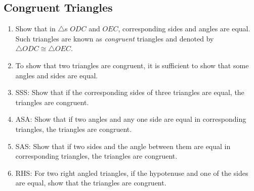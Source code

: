 \subsection{Congruent Triangles}
%
\renewcommand{\theequation}{\theenumi}
\begin{enumerate}[label=\arabic*.,ref=\thesubsection.\theenumi]

\item
	Show that in $\triangle$s $ODC$ and $OEC$, corresponding sides and angles are equal.  Such triangles are known as {\em congruent} triangles and denoted by $\triangle ODC \cong \triangle OEC$.

\item
To show that two triangles are congruent, it is sufficient to show that some angles and sides are equal.  

\item
SSS:	Show that if the corresponding sides of three triangles are equal, the triangles are congruent.

\item
ASA:	Show that if two angles and any one side  are equal in corresponding triangles, the triangles are congruent.

\item
SAS:	Show that if two sides and the angle between them are equal in corresponding triangles, the triangles are congruent.

\item
RHS:	For two right angled triangles, if the hypotenuse and one of the sides are equal, show that the triangles are congruent.
\end{enumerate}

